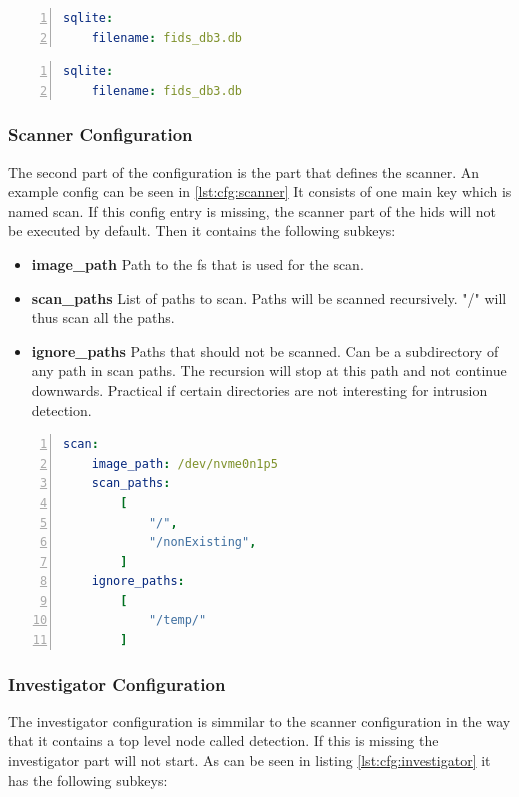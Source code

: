 \begin{lstlisting}[language=yaml, numbers=left, caption=SQLite Configuration, label=lst:cfg:sqlite]
sqlite:
	filename: fids_db3.db
\end{lstlisting}


\begin{lstlisting}[language=yaml, numbers=left, caption=Postgres Configuration, label=lst:cfg:postgres]
sqlite:
	filename: fids_db3.db
\end{lstlisting}

\subsubsection{Scanner Configuration}

The second part of the configuration is the part that defines the scanner. An example config can be seen in \ref{lst:cfg:scanner} It consists of one main key which is named scan. If this config entry is missing, the scanner part of the \gls{hids} will not be executed by default. Then it contains the following subkeys:

\begin{itemize}
	\item		\textbf{image\_path} Path to the \gls{fs} that is used for the scan.
	\item		\textbf{scan\_paths} List of paths to scan. Paths will be scanned recursively. "/" will thus scan all the paths.
	\item		\textbf{ignore\_paths} Paths that should not be scanned. Can be a subdirectory of any path in scan paths. The recursion will stop at this path and not continue downwards. Practical if certain directories are not interesting for intrusion detection.
\end{itemize}

\begin{lstlisting}[language=yaml, numbers=left, caption=Scanner Configuration, label=lst:cfg:scanner]
scan:
	image_path: /dev/nvme0n1p5
	scan_paths: 
		[
			"/",
			"/nonExisting",
		]
	ignore_paths: 
		[
			"/temp/"
		]
\end{lstlisting}

\subsubsection{Investigator Configuration}

The investigator configuration is simmilar to the scanner configuration in the way that it contains a top level node called detection. If this is missing the investigator part will not start. As can be seen in listing \ref{lst:cfg:investigator} it has the following subkeys:

